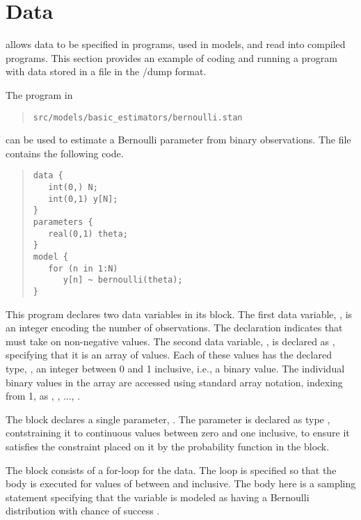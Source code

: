 \section{Data}

\Stan allows data to be specified in programs, used in models, and
read into compiled \Stan programs. This section provides an example of
coding and running a \Stan program with data stored in a file in the
\SPLUS/\R dump format.

The \Stan program in 
\begin{quote}
\begin{Verbatim}
src/models/basic_estimators/bernoulli.stan
\end{Verbatim}
\end{quote}
can be used to estimate a Bernoulli parameter  from
 binary observations.  The file contains the following code.
%
\begin{quote}
\begin{Verbatim}
data {
   int(0,) N;
   int(0,1) y[N];
}
parameters {
   real(0,1) theta;
}
model {
   for (n in 1:N)
      y[n] ~ bernoulli(theta);
}
\end{Verbatim}
\end{quote}
%
This program declares two data variables in its  block.
The first data variable, , is an integer encoding the number
of observations.  The declaration  indicates that
 must take on non-negative values.  The second data variable,
, is declared as , specifying that it is an array
of  values.  Each of these values has the declared type,
, an integer between 0 and 1 inclusive, i.e., a binary
value.  The  individual binary values in the array 
are accessed using standard array notation, indexing from 1, as ,
, ..., .

The  block declares a single parameter, .
The parameter  is declared as type ,
contstraining it to continuous values between zero and one inclusive,
to ensure it satisfies the constraint placed on it by the probability
function  in the  block.

The  block consists of a for-loop for the data.   The loop is
specified so that the body is executed for values of  between
 and  inclusive.  The body here is a sampling
statement specifying that the variable  is modeled as
having a Bernoulli distribution with chance of success .  

